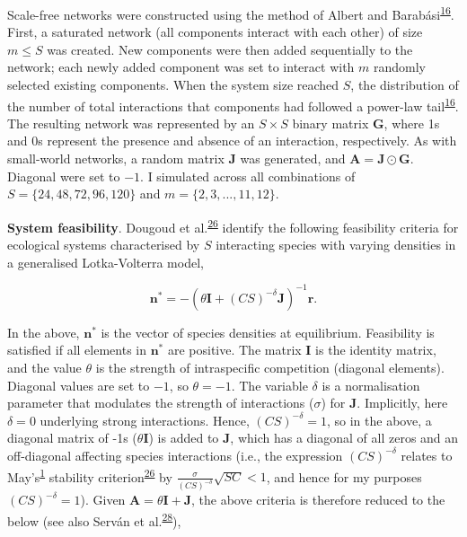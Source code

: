 \documentclass[]{article}
\begin{document}
Scale-free networks were constructed using the method of Albert and
Barabási\textsuperscript{\protect\hyperlink{ref-Albert2002}{16}}. First,
a saturated network (all components interact with each other) of size
\(m \leq S\) was created. New components were then added sequentially to
the network; each newly added component was set to interact with \(m\)
randomly selected existing components. When the system size reached
\(S\), the distribution of the number of total interactions that
components had followed a power-law
tail\textsuperscript{\protect\hyperlink{ref-Albert2002}{16}}. The
resulting network was represented by an \(S \times S\) binary matrix
\(\mathbf{G}\), where 1s and 0s represent the presence and absence of an
interaction, respectively. As with small-world networks, a random matrix
\(\mathbf{J}\) was generated, and
\(\mathbf{A} = \mathbf{J} \odot \mathbf{G}\). Diagonal were set to
\(-1\). I simulated across all combinations of
\(S = \{24, 48, 72, 96, 120\}\) and \(m = \{2, 3, ..., 11, 12\}\).

\textbf{System feasibility}. Dougoud et
al.\textsuperscript{\protect\hyperlink{ref-Dougoud2018}{26}} identify
the following feasibility criteria for ecological systems characterised
by \(S\) interacting species with varying densities in a generalised
Lotka-Volterra model,

\[\mathbf{n^{*}} = -\left(\theta \mathbf{I} + (CS)^{-\delta}\mathbf{J} \right)^{-1}\mathbf{r}.\]

In the above, \(\mathbf{n^{*}}\) is the vector of species densities at
equilibrium. Feasibility is satisfied if all elements in
\(\mathbf{n^{*}}\) are positive. The matrix \(\mathbf{I}\) is the
identity matrix, and the value \(\theta\) is the strength of
intraspecific competition (diagonal elements). Diagonal values are set
to \(-1\), so \(\theta = -1\). The variable \(\delta\) is a
normalisation parameter that modulates the strength of interactions
(\(\sigma\)) for \(\mathbf{J}\). Implicitly, here \(\delta = 0\)
underlying strong interactions. Hence, \((CS)^{-\delta} = 1\), so in the
above, a diagonal matrix of -1s (\(\theta \mathbf{I}\)) is added to
\(\mathbf{J}\), which has a diagonal of all zeros and an off-diagonal
affecting species interactions (i.e., the expression \((CS)^{-\delta}\)
relates to May's\textsuperscript{\protect\hyperlink{ref-May1972}{1}}
stability
criterion\textsuperscript{\protect\hyperlink{ref-Dougoud2018}{26}} by
\(\frac{\sigma}{(CS)^{-\delta}}\sqrt{SC} < 1\), and hence for my
purposes \((CS)^{-\delta} = 1\)). Given
\(\mathbf{A} = \theta\mathbf{I + J}\), the above criteria is therefore
reduced to the below (see also Serván et
al.\textsuperscript{\protect\hyperlink{ref-Servan2018}{28}}),
\end{document}
